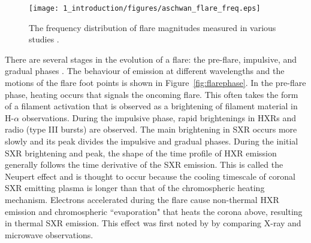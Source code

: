 \begin{figure}[!t]
\centerline{\texttt{[image: 1\_introduction/figures/aschwan\_flare\_freq.eps]}}
\caption[The frequency distribution of flare magnitudes measured in various studies.]{The frequency distribution of flare magnitudes measured in various studies \citep[from][]{Aschwanden:2011}.}
\label{fig:flaredist}
\end{figure}

There are several stages in the evolution of a flare: the pre-flare, impulsive, and gradual phases \citep{Fletcher:2011}. The behaviour of emission at different wavelengths and the motions of the flare foot points is shown in Figure~\ref{fig:flarephase}. In the pre-flare phase, heating occurs that signals the oncoming flare. This often takes the form of a filament activation that is observed as a brightening of filament material in H-$\alpha$ observations. During the impulsive phase, rapid brightenings in \glspl{HXR} and radio (type III bursts) are observed. The main brightening in \gls{SXR} occurs more slowly and its peak divides the impulsive and gradual phases. During the initial \gls{SXR} brightening and peak, the shape of the time profile of \gls{HXR} emission generally follows the time derivative of the \gls{SXR} emission. This is called the Neupert effect and is thought to occur because the cooling timescale of coronal \gls{SXR} emitting plasma is longer than that of the chromospheric heating mechanism. Electrons accelerated during the flare cause non-thermal \gls{HXR} emission and chromospheric ``evaporation" that heats the corona above, resulting in thermal \gls{SXR} emission. This effect was first noted by \cite{Neupert:1968} by comparing X-ray and microwave observations.

\begin{table}
\caption[The GOES flare classification scheme.]{The GOES flare classification scheme, where peak fluxes are integrated over the 1-8\,\AA\ bandpass.}
\label{tab:gclass}
\end{table}

